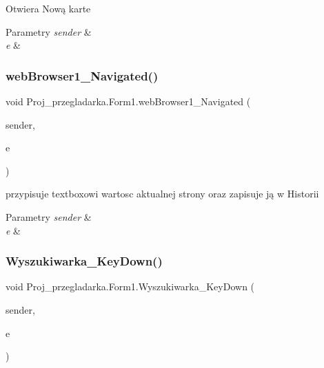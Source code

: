 Otwiera Nową karte 


\begin{DoxyParams}{Parametry}
{\em sender} & \\
\hline
{\em e} & \\
\hline
\end{DoxyParams}
\mbox{\label{class_proj__przegladarka_1_1_form1_a163389d3e2bd2a665bbcc320d98519a1}} 
\subsubsection{\texorpdfstring{webBrowser1\_Navigated()}{webBrowser1\_Navigated()}}
{\footnotesize\ttfamily void Proj\+\_\+przegladarka.\+Form1.\+web\+Browser1\+\_\+\+Navigated (\begin{DoxyParamCaption}\item[{object}]{sender,  }\item[{Web\+Browser\+Navigated\+Event\+Args}]{e }\end{DoxyParamCaption})\hspace{0.3cm}{\ttfamily [private]}}



przypisuje textboxowi wartosc aktualnej strony oraz zapisuje ją w Historii 


\begin{DoxyParams}{Parametry}
{\em sender} & \\
\hline
{\em e} & \\
\hline
\end{DoxyParams}
\mbox{\label{class_proj__przegladarka_1_1_form1_a3aa0f9559486fa35673dfce6387aa615}} 
\subsubsection{\texorpdfstring{Wyszukiwarka\_KeyDown()}{Wyszukiwarka\_KeyDown()}}
{\footnotesize\ttfamily void Proj\+\_\+przegladarka.\+Form1.\+Wyszukiwarka\+\_\+\+Key\+Down (\begin{DoxyParamCaption}\item[{object}]{sender,  }\item[{Key\+Event\+Args}]{e }\end{DoxyParamCaption})\hspace{0.3cm}{\ttfamily [private]}}



